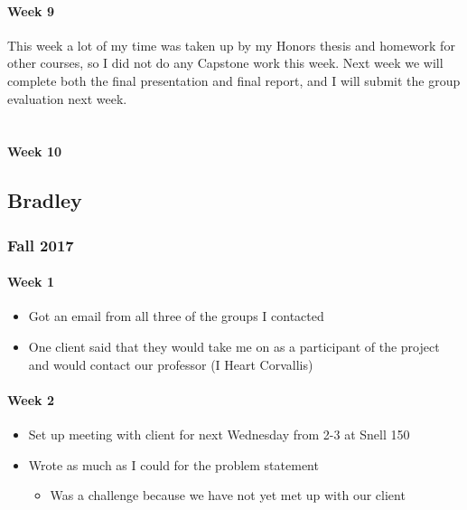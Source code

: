 \documentclass[onecolumn, draftclsnofoot,10pt, compsoc]{IEEEtran}
\begin{document}
      \paragraph{Week 9}
      This week a lot of my time was taken up by my Honors thesis and homework for other courses, so I did not do any Capstone work this week. Next week we will complete both the final presentation and final report, and I will submit the group evaluation next week. \\ \\

      \paragraph{Week 10}

  \subsection{Bradley}
    \subsubsection{Fall 2017}
      \paragraph{Week 1}
        \begin{itemize}
          \item Got an email from all three of the groups I contacted
          \item One client said that they would take me on as a participant of the project and would contact our professor (I Heart Corvallis)
        \end{itemize}

      \paragraph{Week 2}
        \begin{itemize}
          \item Set up meeting with client for next Wednesday from 2-3 at Snell 150
          \item Wrote as much as I could for the problem statement
            \begin{itemize}
              \item Was a challenge because we have not yet met up with our client
            \end{itemize}
        \end{itemize}
\end{document}
